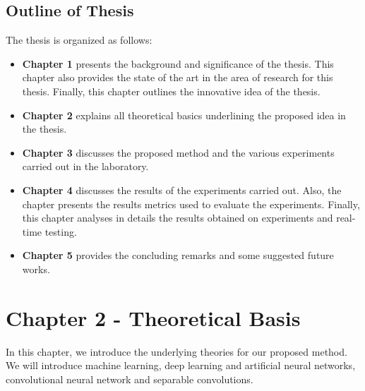 \documentclass[master]{thesis-uestc}
\begin{document}
\section{Outline of Thesis}
The thesis is organized as follows:
\begin{itemize}
    \item \textbf{Chapter 1} presents the background and significance of the thesis. This chapter also provides the state of the art in the area of research for this thesis. Finally, this chapter outlines the innovative idea of the thesis.
    \item \textbf{Chapter 2} explains all theoretical basics underlining the proposed idea in the thesis.
    \item \textbf{Chapter 3} discusses the proposed method and the various experiments carried out in the laboratory.
    \item \textbf{Chapter 4} discusses the results of the experiments carried out. Also, the chapter presents the results metrics used to evaluate the experiments. Finally, this chapter analyses in details the results obtained on experiments and real-time testing.
    \item \textbf{Chapter 5} provides the concluding remarks and some suggested future works.
\end{itemize}


\chapter{Chapter 2 - Theoretical Basis}
In this chapter, we introduce the underlying theories for our proposed method. We will introduce machine learning, deep learning and artificial neural networks, convolutional neural network and separable convolutions.
\end{document}
